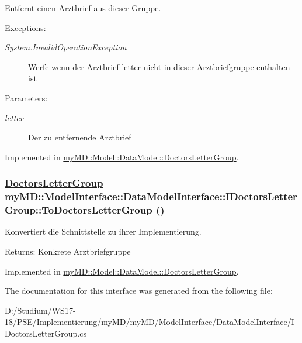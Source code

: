 Entfernt einen Arztbrief aus dieser Gruppe. 

\begin{Desc}
\item[Exceptions:]
\begin{description}
\item[{\em System.Invalid\-Operation\-Exception}]Werfe wenn der Arztbrief letter nicht in dieser Arztbriefgruppe enthalten ist\end{description}
\end{Desc}
\begin{Desc}
\item[Parameters:]
\begin{description}
\item[{\em letter}]Der zu entfernende Arztbrief\end{description}
\end{Desc}


Implemented in \hyperlink{classmy_m_d_1_1_model_1_1_data_model_1_1_doctors_letter_group_938bc29cf5917f270a203b621472c238}{my\-MD::Model::Data\-Model::Doctors\-Letter\-Group}.\hypertarget{interfacemy_m_d_1_1_model_interface_1_1_data_model_interface_1_1_i_doctors_letter_group_6135e1709db8de80bcc0241d6d99880e}{
\subsubsection[ToDoctorsLetterGroup]{\setlength{\rightskip}{0pt plus 5cm}\hyperlink{classmy_m_d_1_1_model_1_1_data_model_1_1_doctors_letter_group}{Doctors\-Letter\-Group} my\-MD::Model\-Interface::Data\-Model\-Interface::IDoctors\-Letter\-Group::To\-Doctors\-Letter\-Group ()}}
\label{d1/df0/interfacemy_m_d_1_1_model_interface_1_1_data_model_interface_1_1_i_doctors_letter_group_6135e1709db8de80bcc0241d6d99880e}


Konvertiert die Schnittstelle zu ihrer Implementierung. 

\begin{Desc}
\item[Returns:]Konkrete Arztbriefgruppe\end{Desc}


Implemented in \hyperlink{classmy_m_d_1_1_model_1_1_data_model_1_1_doctors_letter_group_6135e1709db8de80bcc0241d6d99880e}{my\-MD::Model::Data\-Model::Doctors\-Letter\-Group}.

The documentation for this interface was generated from the following file:\begin{CompactItemize}
\item 
D:/Studium/WS17-18/PSE/Implementierung/my\-MD/my\-MD/Model\-Interface/Data\-Model\-Interface/IDoctors\-Letter\-Group.cs\end{CompactItemize}
